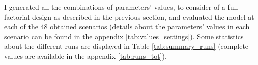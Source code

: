 
I generated all the combinations of parameters' values, to consider of a full-factorial design as described in the previous section, and evaluated the model at each of the 48 obtained scenarios (details about the parameters' values in each scenario can be found in the appendix \ref{tab:values_settings}). Some statistics about the different runs are displayed in Table \ref{tab:summary_runs} (complete values are available in the appendix \ref{tab:runs_tot}). 

\begin{table}[H]
\centering
{}
        \caption{Summary of the 48 model runs.}
    \label{tab:summary_runs}
\end{table}

